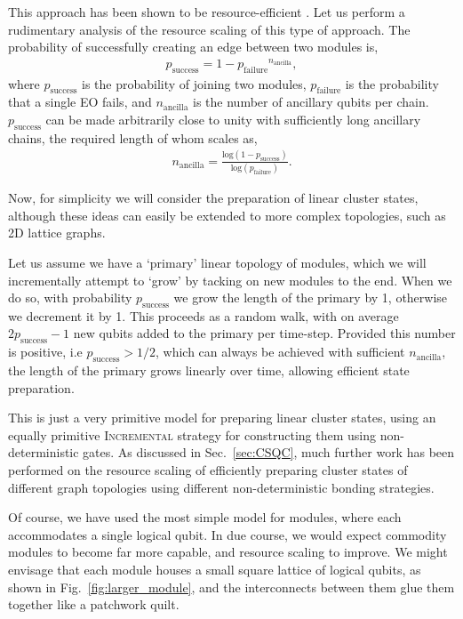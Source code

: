 \documentclass[aps, rmp, twocolumn, amsmath, amssymb, nofootinbib, superscriptaddress, longbibliography, floatfix, table-of-contents, eqsecnum]{revtex4-1}
\begin{document}
This approach has been shown to be resource-efficient \cite{bib:YoranReznik03, bib:Nielsen04}. Let us perform a rudimentary analysis of the resource scaling of this type of approach. The probability of successfully creating an edge between two modules is,
\begin{align}
p_\text{success} = 1 - {p_\text{failure}}^{n_\text{ancilla}},
\end{align}
where $p_\text{success}$ is the probability of joining two modules, $p_\text{failure}$ is the probability that a single EO fails, and $n_\text{ancilla}$ is the number of ancillary qubits per chain. $p_\text{success}$ can be made arbitrarily close to unity with sufficiently long ancillary chains, the required length of whom scales as,
\begin{align}
n_\text{ancilla} = \frac{\text{log}(1-p_\text{success})}{\text{log}(p_\text{failure})}.
\end{align}

Now, for simplicity we will consider the preparation of linear cluster states, although these ideas can easily be extended to more complex topologies, such as 2D lattice graphs.

Let us assume we have a `primary' linear topology of modules, which we will incrementally attempt to `grow' by tacking on new modules to the end. When we do so, with probability $p_\text{success}$ we grow the length of the primary by 1, otherwise we decrement it by 1. This proceeds as a random walk, with on average \mbox{$2p_\text{success}-1$} new qubits added to the primary per time-step. Provided this number is positive, i.e \mbox{$p_\text{success}>1/2$}, which can always be achieved with sufficient $n_\text{ancilla}$, the length of the primary grows linearly over time, allowing efficient state preparation.

This is just a very primitive model for preparing linear cluster states, using an equally primitive \textsc{Incremental} strategy for constructing them using non-deterministic gates. As discussed in Sec.~\ref{sec:CSQC}, much further work has been performed on the resource scaling of efficiently preparing cluster states of different graph topologies using different non-deterministic bonding strategies.

Of course, we have used the most simple model for modules, where each accommodates a single logical qubit. In due course, we would expect commodity modules to become far more capable, and resource scaling to improve. We might envisage that each module houses a small square lattice of logical qubits, as shown in Fig.~\ref{fig:larger_module}, and the interconnects between them glue them together like a patchwork quilt.
\end{document}

